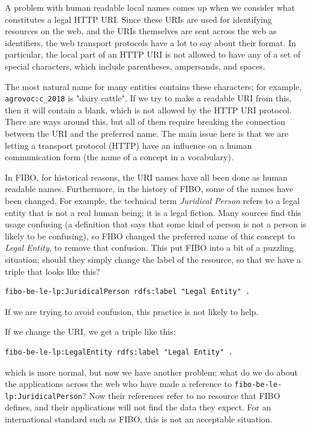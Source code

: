 A problem with human readable local names comes up when we consider what constitutes 
a legal HTTP URI.  Since these URIs are used for identifying resources on the web, and
the URIs themselves are sent across the web as identifiers, the web transport protocols 
have a lot to say about their format.  In particular, the local part of an HTTP URI 
is not allowed to have any of a set of special characters, which include parentheses, ampersands, and spaces. 

The most natural name for many entities contains these characters; for 
example, \texttt{agrovoc:c\_2018} is "dairy cattle".  If we try to make a 
readable URI from this,
then it will contain a blank, which is not allowed by the HTTP URI protocol.  There
are ways around this, but all of them require breaking the connection between the URI
and the preferred name.  The main issue here is that we are letting a transport
protocol (HTTP) have an influence on a human communication form (the name of 
a concept in a vocabulary). 

In FIBO, for historical reasons, the URI names have all been done as human readable names.
Furthermore, in the history of FIBO, some of the names have been changed.  For example, 
the technical term \emph{Juridical Person} refers to a legal entity that is not a real
human being; it is a legal fiction.  Many sources find this usage confusing (a definition
that says that some kind of person is not a person is likely to be confusing), so 
FIBO changed the preferred name of this concept to \emph{Legal Entity}, to remove 
that confusion.  This put FIBO into a bit of a puzzling situation; should they 
simply change the label of the resource, so that we have a triple that looks like 
this?

\begin{lstlisting}
fibo-be-le-lp:JuridicalPerson rdfs:label "Legal Entity" .
\end{lstlisting}


If we are trying to avoid confusion, this practice is not likely to help. 

If we change the URI, we get a triple like this:

\begin{lstlisting}
fibo-be-le-lp:LegalEntity rdfs:label "Legal Entity" .
\end{lstlisting}


which is more normal, but now we have another problem; what do we do about the applications
across the web who have made a reference to \texttt{fibo-be-le-lp:JuridicalPerson}?  
Now their references refer to no resource that FIBO defines, and their applications
will not find the data they expect.  For an international standard such as FIBO, this
is not an acceptable situation. 

